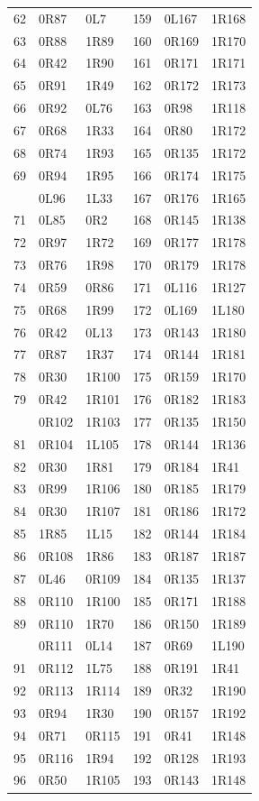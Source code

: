 \begin{longtable}{@{}rll@{\qquad}rll@{}}
62 & 0R87 & 0L7 & 159 & 0L167 & 1R168\\
63 & 0R88 & 1R89 & 160 & 0R169 & 1R170\\
64 & 0R42 & 1R90 & 161 & 0R171 & 1R171\\
65 & 0R91 & 1R49 & 162 & 0R172 & 1R173\\
66 & 0R92 & 0L76 & 163 & 0R98 & 1R118\\
67 & 0R68 & 1R33 & 164 & 0R80 & 1R172\\
68 & 0R74 & 1R93 & 165 & 0R135 & 1R172\\
69 & 0R94 & 1R95 & 166 & 0R174 & 1R175\\
\addlinespace[3pt]
70 & 0L96 & 1L33 & 167 & 0R176 & 1R165\\
71 & 0L85 & 0R2 & 168 & 0R145 & 1R138\\
72 & 0R97 & 1R72 & 169 & 0R177 & 1R178\\
73 & 0R76 & 1R98 & 170 & 0R179 & 1R178\\
74 & 0R59 & 0R86 & 171 & 0L116 & 1R127\\
75 & 0R68 & 1R99 & 172 & 0L169 & 1L180\\
76 & 0R42 & 0L13 & 173 & 0R143 & 1R180\\
77 & 0R87 & 1R37 & 174 & 0R144 & 1R181\\
78 & 0R30 & 1R100 & 175 & 0R159 & 1R170\\
79 & 0R42 & 1R101 & 176 & 0R182 & 1R183\\
\addlinespace[3pt]
80 & 0R102 & 1R103 & 177 & 0R135 & 1R150\\
81 & 0R104 & 1L105 & 178 & 0R144 & 1R136\\
82 & 0R30 & 1R81 & 179 & 0R184 & 1R41\\
83 & 0R99 & 1R106 & 180 & 0R185 & 1R179\\
84 & 0R30 & 1R107 & 181 & 0R186 & 1R172\\
85 & 1R85 & 1L15 & 182 & 0R144 & 1R184\\
86 & 0R108 & 1R86 & 183 & 0R187 & 1R187\\
87 & 0L46 & 0R109 & 184 & 0R135 & 1R137\\
88 & 0R110 & 1R100 & 185 & 0R171 & 1R188\\
89 & 0R110 & 1R70 & 186 & 0R150 & 1R189\\
\addlinespace[3pt]
90 & 0R111 & 0L14 & 187 & 0R69 & 1L190\\
91 & 0R112 & 1L75 & 188 & 0R191 & 1R41\\
92 & 0R113 & 1R114 & 189 & 0R32 & 1R190\\
93 & 0R94 & 1R30 & 190 & 0R157 & 1R192\\
94 & 0R71 & 0R115 & 191 & 0R41 & 1R148\\
95 & 0R116 & 1R94 & 192 & 0R128 & 1R193\\
96 & 0R50 & 1R105 & 193 & 0R143 & 1R148\\
\end{longtable}
\endgroup
